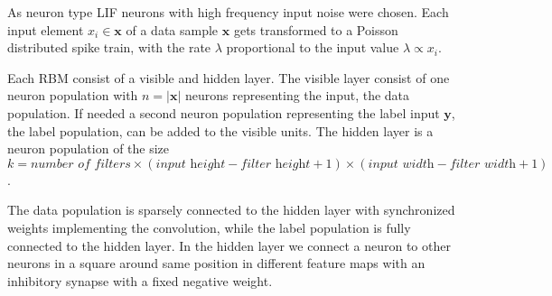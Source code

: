 As neuron type LIF neurons with high frequency input noise were chosen.
Each input element $x_i \in \textbf{x}$ of a data sample $\textbf{x}$ gets transformed to a Poisson distributed spike train, with the rate $\lambda$ proportional to the input value $\lambda \propto x_i$. 

Each RBM consist of a visible and hidden layer. 
The visible layer consist of one neuron population with $n = |\textbf{x}|$ neurons representing the input, the data population. 
If needed a second neuron population representing the label input $\textbf{y}$, the label population, can be added to the visible units.
The hidden layer is a neuron population of the size  $ k = \textit{number of filters} \times (\textit{input height} - \textit{filter height} + 1) \times (\textit{input width} - \textit{filter width} + 1)$.

The data population is sparsely connected to the hidden layer with synchronized weights implementing the convolution, while the label population is fully connected to the hidden layer.
In the hidden layer we connect a neuron to other neurons in a square around same position in different feature maps with an inhibitory synapse with a fixed negative weight.

